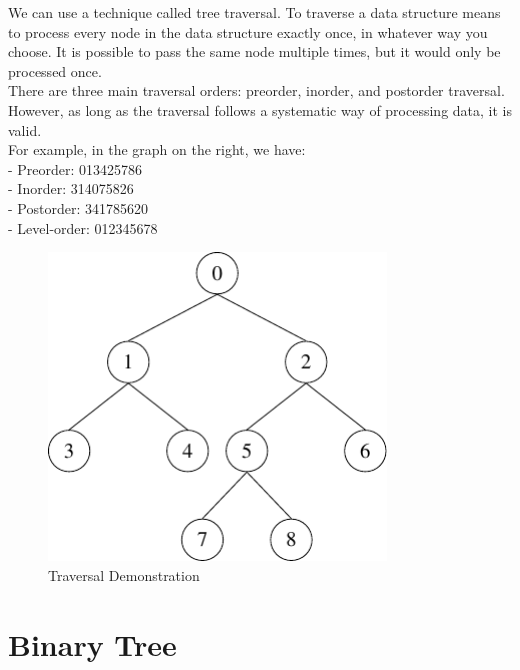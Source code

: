 \begin{minipage}{0.6\textwidth}
We can use a technique called tree traversal. To traverse a data structure means to process every node in the data structure exactly once, in whatever way you choose. It is possible to pass the same node multiple times, but it would only be processed once.\\[5pt]
There are three main traversal orders: preorder, inorder, and postorder traversal. However, as long as the traversal follows a systematic way of processing data, it is valid.\\[5pt]
For example, in the graph on the right, we have:\\[5pt]
- Preorder: 013425786  \\[5pt]
- Inorder: 314075826  \\[5pt]
- Postorder: 341785620  \\[5pt]
- Level-order: 012345678
\end{minipage}
\begin{minipage}{0.4\textwidth}
\begin{figure}[H]
  \centering
  \includegraphics[width=0.8\textwidth]{Figure/Traversal.pdf}
  \caption{Traversal Demonstration}
\end{figure}
\end{minipage}

\section{Binary Tree}
